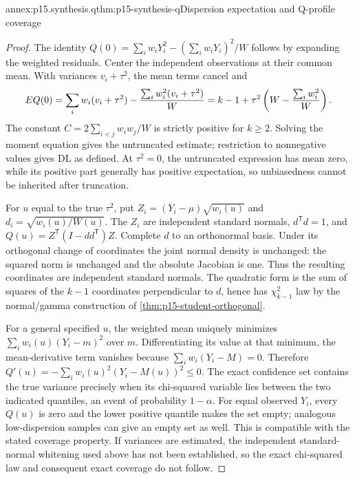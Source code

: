 \begin{annexitem}{annex:p15.synthesis.q}{thm:p15-synthesis-q}{Dispersion expectation and Q-profile coverage}
\begin{proof}
The identity
\(Q(0)=\sum_iw_iY_i^2-(\sum_iw_iY_i)^2/W\) follows by expanding
the weighted residuals. Center the independent observations at their common
mean. With variances \(v_i+\tau^2\), the mean terms cancel and
\[
 E Q(0)=\sum_iw_i(v_i+\tau^2)
       -{\sum_iw_i^2(v_i+\tau^2)\over W}
       =k-1+\tau^2\left(W-{\sum_iw_i^2\over W}\right).
\]
The constant \(C=2\sum_{i<j}w_iw_j/W\) is strictly positive for
\(k\geq2\). Solving the moment equation gives the untruncated estimate;
restriction to nonnegative values gives DL as defined. At \(\tau^2=0\),
the untruncated expression has mean zero, while its positive part generally
has positive expectation, so unbiasedness cannot be inherited after truncation.

For \(u\) equal to the true \(\tau^2\), put
\(Z_i=(Y_i-\mu)\sqrt{w_i(u)}\) and
\(d_i=\sqrt{w_i(u)/W(u)}\). The \(Z_i\) are independent standard
normals, \(d^{\mathsf T}d=1\), and
\(Q(u)=Z^{\mathsf T}(I-dd^{\mathsf T})Z\).
Complete \(d\) to an orthonormal basis. Under its orthogonal change of
coordinates the joint normal density is unchanged: the squared norm is
unchanged and the absolute Jacobian is one. Thus the resulting coordinates
are independent standard normals. The quadratic form is the sum of squares
of the \(k-1\) coordinates perpendicular to \(d\), hence has
\(\chi^2_{k-1}\) law by the normal/gamma construction of
\ref{thm:p15-student-orthogonal}.

For a general specified \(u\), the weighted mean uniquely minimizes
\(\sum_iw_i(u)(Y_i-m)^2\) over \(m\). Differentiating its value
at that minimum, the mean-derivative term vanishes because
\(\sum_iw_i(Y_i-M)=0\). Therefore
\(Q'(u)=-\sum_iw_i(u)^2(Y_i-M(u))^2\leq0\).
The exact confidence set contains the true variance precisely when its
chi-squared variable lies between the two indicated quantiles, an event of
probability \(1-\alpha\). For equal observed \(Y_i\), every \(Q(u)\)
is zero and the lower positive quantile makes the set empty; analogous
low-dispersion samples can give an empty set as well. This is compatible with
the stated coverage property. If variances are estimated, the independent
standard-normal whitening used above has not been established, so the exact
chi-squared law and consequent exact coverage do not follow.
\end{proof}
\end{annexitem}

